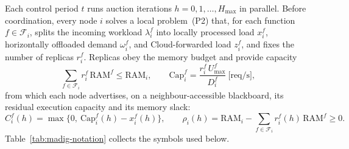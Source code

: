 Each control period $t$ runs auction iterations $h=0,1,\dots,H_{\max}$ in
parallel. Before coordination, every node $i$ solves a local problem~(P2)
that, for each function $f\in\mathcal{F}_i$, splits the incoming workload
$\lambda_i^f$ into locally processed load $x_i^f$, horizontally offloaded
demand $\omega_i^f$, and Cloud-forwarded load $z_i^f$, and fixes the number of
replicas $r_i^f$. Replicas obey the memory budget and provide capacity
\begin{equation}
  \sum_{f\in\mathcal{F}_i} r_i^f\,\mathrm{RAM}^f \le \mathrm{RAM}_i,
  \qquad
  \mathrm{Cap}_i^f = \frac{r_i^f\,U^f_{\max}}{D_i^f}\ \text{[req/s]} ,
  \tag{1,2}
\end{equation}
from which each node advertises, on a neighbour-accessible blackboard, its
residual execution capacity and its memory slack:
\begin{equation}
  C_i^f(h) = \max\!\big\{0,\ \mathrm{Cap}_i^f(h) - x_i^f(h)\big\},
  \qquad
  \rho_i(h) = \mathrm{RAM}_i - \sum_{f\in\mathcal{F}_i} r_i^f(h)\,\mathrm{RAM}^f \ge 0 .
  \tag{12,13}
\end{equation}
Table~\ref{tab:madig-notation} collects the symbols used below.

